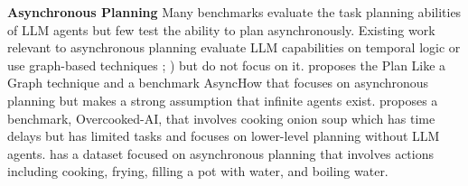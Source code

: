 \textbf{Asynchronous Planning}
Many benchmarks evaluate the task planning abilities of LLM agents \citep{shridhar2021alfworldaligningtextembodied, gong2023mindagent,liu2018reinforcementlearningwebinterfaces,valmeekam2023planbenchextensiblebenchmarkevaluating,yao2024taubenchbenchmarktoolagentuserinteraction,zhou2024webarenarealisticwebenvironment,yao2023webshopscalablerealworldweb} but few test the ability to plan asynchronously. Existing work relevant to asynchronous planning evaluate LLM capabilities on temporal logic \citep{wang2024trambenchmarkingtemporalreasoning} or use graph-based techniques \citep{wu2024graphlearningimprovetask}; \citep{Besta_2024}) but do not focus on it. \citep{lin2024graphenhancedlargelanguagemodels} proposes the Plan Like a Graph technique and a benchmark AsyncHow that focuses on asynchronous planning but makes a strong assumption that infinite agents exist. \citep{carroll2020utilitylearninghumanshumanai} proposes a benchmark, Overcooked-AI, that involves cooking onion soup which has time delays but has limited tasks and focuses on lower-level planning without LLM agents. \robotouille{} has a dataset focused on asynchronous planning that involves actions including cooking, frying, filling a pot with water, and boiling water.

